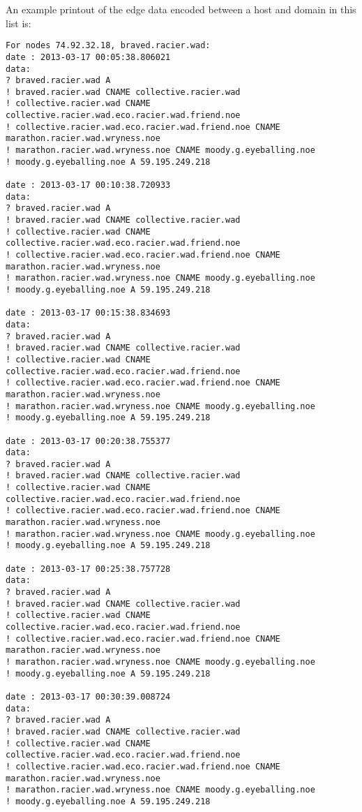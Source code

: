 \documentclass{article} %
\begin{document}
An example printout of the edge data encoded between a host and domain in this list is:
\begin{verbatim}
For nodes 74.92.32.18, braved.racier.wad:
date : 2013-03-17 00:05:38.806021
data: 
? braved.racier.wad A
! braved.racier.wad CNAME collective.racier.wad
! collective.racier.wad CNAME collective.racier.wad.eco.racier.wad.friend.noe
! collective.racier.wad.eco.racier.wad.friend.noe CNAME marathon.racier.wad.wryness.noe
! marathon.racier.wad.wryness.noe CNAME moody.g.eyeballing.noe
! moody.g.eyeballing.noe A 59.195.249.218

date : 2013-03-17 00:10:38.720933
data: 
? braved.racier.wad A
! braved.racier.wad CNAME collective.racier.wad
! collective.racier.wad CNAME collective.racier.wad.eco.racier.wad.friend.noe
! collective.racier.wad.eco.racier.wad.friend.noe CNAME marathon.racier.wad.wryness.noe
! marathon.racier.wad.wryness.noe CNAME moody.g.eyeballing.noe
! moody.g.eyeballing.noe A 59.195.249.218

date : 2013-03-17 00:15:38.834693
data: 
? braved.racier.wad A
! braved.racier.wad CNAME collective.racier.wad
! collective.racier.wad CNAME collective.racier.wad.eco.racier.wad.friend.noe
! collective.racier.wad.eco.racier.wad.friend.noe CNAME marathon.racier.wad.wryness.noe
! marathon.racier.wad.wryness.noe CNAME moody.g.eyeballing.noe
! moody.g.eyeballing.noe A 59.195.249.218

date : 2013-03-17 00:20:38.755377
data: 
? braved.racier.wad A
! braved.racier.wad CNAME collective.racier.wad
! collective.racier.wad CNAME collective.racier.wad.eco.racier.wad.friend.noe
! collective.racier.wad.eco.racier.wad.friend.noe CNAME marathon.racier.wad.wryness.noe
! marathon.racier.wad.wryness.noe CNAME moody.g.eyeballing.noe
! moody.g.eyeballing.noe A 59.195.249.218

date : 2013-03-17 00:25:38.757728
data: 
? braved.racier.wad A
! braved.racier.wad CNAME collective.racier.wad
! collective.racier.wad CNAME collective.racier.wad.eco.racier.wad.friend.noe
! collective.racier.wad.eco.racier.wad.friend.noe CNAME marathon.racier.wad.wryness.noe
! marathon.racier.wad.wryness.noe CNAME moody.g.eyeballing.noe
! moody.g.eyeballing.noe A 59.195.249.218

date : 2013-03-17 00:30:39.008724
data: 
? braved.racier.wad A
! braved.racier.wad CNAME collective.racier.wad
! collective.racier.wad CNAME collective.racier.wad.eco.racier.wad.friend.noe
! collective.racier.wad.eco.racier.wad.friend.noe CNAME marathon.racier.wad.wryness.noe
! marathon.racier.wad.wryness.noe CNAME moody.g.eyeballing.noe
! moody.g.eyeballing.noe A 59.195.249.218
\end{verbatim}
\end{document}
